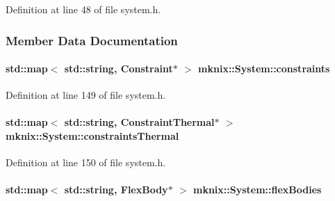 Definition at line 48 of file system.\+h.



\subsubsection{Member Data Documentation}
\hypertarget{classmknix_1_1_system_a6777972d1e5914dbe488e704ca8a0b8d}{}
\paragraph[{constraints}]{\setlength{\rightskip}{0pt plus 5cm}std\+::map$<$ std\+::string, {\bf Constraint}$\ast$ $>$ mknix\+::\+System\+::constraints\hspace{0.3cm}{\ttfamily [protected]}}\label{classmknix_1_1_system_a6777972d1e5914dbe488e704ca8a0b8d}


Definition at line 149 of file system.\+h.

\hypertarget{classmknix_1_1_system_abec0485325cb37e460f9f8eab40374ea}{}
\paragraph[{constraints\+Thermal}]{\setlength{\rightskip}{0pt plus 5cm}std\+::map$<$ std\+::string, {\bf Constraint\+Thermal}$\ast$ $>$ mknix\+::\+System\+::constraints\+Thermal\hspace{0.3cm}{\ttfamily [protected]}}\label{classmknix_1_1_system_abec0485325cb37e460f9f8eab40374ea}


Definition at line 150 of file system.\+h.

\hypertarget{classmknix_1_1_system_a20ca9590b01b280feb622ac158fcf4ba}{}
\paragraph[{flex\+Bodies}]{\setlength{\rightskip}{0pt plus 5cm}std\+::map$<$ std\+::string, {\bf Flex\+Body}$\ast$ $>$ mknix\+::\+System\+::flex\+Bodies\hspace{0.3cm}{\ttfamily [protected]}}\label{classmknix_1_1_system_a20ca9590b01b280feb622ac158fcf4ba}


